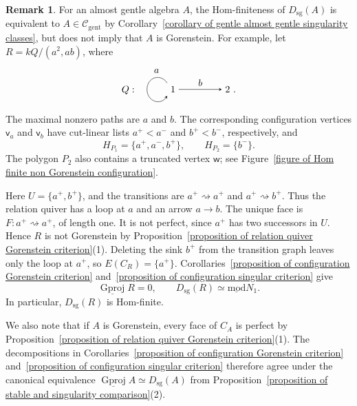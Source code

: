 \documentclass[11pt]{article}
\newcommand{\smod}{\operatorname{\underline{mod}}}
\newcommand{\vv}{\mathsf{v}}
\newcommand{\ww}{\mathsf{w}}
\theoremstyle{definition}
\newtheorem{remark}[theorem]{Remark}
\begin{document}
		\begin{remark}\label{remark of configuration further singular results}
			For an almost gentle algebra $A$, the Hom-finiteness of $D_{\mathrm{sg}}(A)$ is equivalent to $A\in\mathcal C_{\mathrm{gent}}$ by Corollary~\ref{corollary of gentle almost gentle singularity classes}, but does not imply that $A$ is Gorenstein. For example, let $R=kQ/(a^2,ab)$, where
			\[
				Q:\quad
				\begin{tikzpicture}[baseline=(one.base),>=stealth]
					\node (one) at (0,0) {$1$};
					\node (two) at (2,0) {$2$};
					\draw[->] (one.north west)
						.. controls (-.45,.60) and (-.95,.45) .. (-.95,0)
						.. controls (-.95,-.45) and (-.45,-.60) .. (one.south west);
					\node[above] at (-.60,.48) {$a$};
					\draw[->] (one)--node[above] {$b$}(two);
				\end{tikzpicture}.
			\]
			The maximal nonzero paths are $a$ and $b$. The corresponding configuration vertices $\vv_a$ and $\vv_b$ have cut-linear lists $a^+<a^-$ and $b^+<b^-$, respectively, and
			\[
				H_{P_1}=\{a^+,a^-,b^+\},\qquad H_{P_2}=\{b^-\}.
			\]
			The polygon $P_2$ also contains a truncated vertex $\ww$; see Figure~\ref{figure of Hom finite non Gorenstein configuration}.

			Here $U=\{a^+,b^+\}$, and the transitions are $a^+\rightsquigarrow a^+$ and $a^+\rightsquigarrow b^+$. Thus the relation quiver has a loop at $a$ and an arrow $a\to b$. The unique face is $F:a^+\rightsquigarrow a^+$, of length one. It is not perfect, since $a^+$ has two successors in $U$. Hence $R$ is not Gorenstein by Proposition~\ref{proposition of relation quiver Gorenstein criterion}(1). Deleting the sink $b^+$ from the transition graph leaves only the loop at $a^+$, so $E(C_R)=\{a^+\}$. Corollaries~\ref{proposition of configuration Gorenstein criterion} and~\ref{proposition of configuration singular criterion} give
			\[
				\underline{\operatorname{Gproj}}R=0,
				\qquad D_{\mathrm{sg}}(R)\simeq\smod N_1.
			\]
			In particular, $D_{\mathrm{sg}}(R)$ is Hom-finite.

			We also note that if $A$ is Gorenstein, every face of $C_A$ is perfect by Proposition~\ref{proposition of relation quiver Gorenstein criterion}(1). The decompositions in Corollaries~\ref{proposition of configuration Gorenstein criterion} and~\ref{proposition of configuration singular criterion} therefore agree under the canonical equivalence $\underline{\operatorname{Gproj}}A\simeq D_{\mathrm{sg}}(A)$ from Proposition~\ref{proposition of stable and singularity comparison}(2).
		\end{remark}
\end{document}
